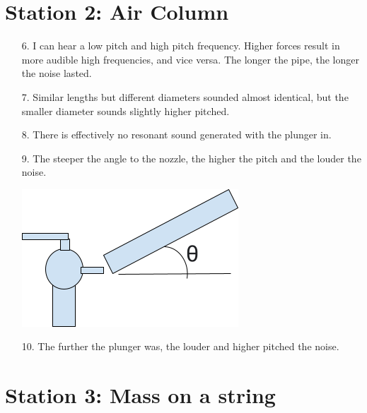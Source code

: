     \section*{Station 2: Air Column}

    \begin{itemize}
        \item [6.] I can hear a low pitch and high pitch frequency. Higher forces result in more audible high frequencies, and vice versa. The longer the pipe, the longer the noise lasted.
        \item [7.] Similar lengths but different diameters sounded almost identical, but the smaller diameter sounds slightly higher pitched.
        \item [8.] There is effectively no resonant sound generated with the plunger in.
        \item [9.] The steeper the angle to the nozzle, the higher the pitch and the louder the noise.
        
        {\centering\includegraphics{image2.png}}

        \item [10.] The further the plunger was, the louder and higher pitched the noise.
    \end{itemize}

    \section*{Station 3: Mass on a string}

